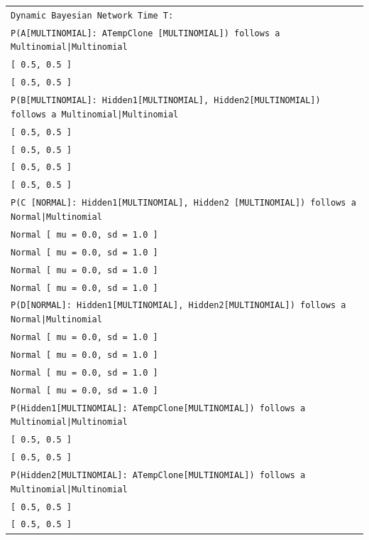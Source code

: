 \vspace{-0.1in}
\begin{table}[H]
\small{\begin{tabular}{l} \\
\texttt{Dynamic Bayesian Network Time T:}\\
\texttt{P(A[MULTINOMIAL]: ATempClone [MULTINOMIAL]) follows a Multinomial|Multinomial}\\
\texttt{[ 0.5, 0.5 ]}\\
\texttt{[ 0.5, 0.5 ]}\\
\texttt{P(B[MULTINOMIAL]: Hidden1[MULTINOMIAL], Hidden2[MULTINOMIAL]) follows a Multinomial|Multinomial}\\
\texttt{[ 0.5, 0.5 ]}\\
\texttt{[ 0.5, 0.5 ]}\\
\texttt{[ 0.5, 0.5 ]}\\
\texttt{[ 0.5, 0.5 ]}\\
\texttt{P(C [NORMAL]: Hidden1[MULTINOMIAL], Hidden2 [MULTINOMIAL]) follows a Normal|Multinomial}\\
\texttt{Normal [ mu = 0.0, sd = 1.0 ]}\\
\texttt{Normal [ mu = 0.0, sd = 1.0 ]}\\
\texttt{Normal [ mu = 0.0, sd = 1.0 ]}\\
\texttt{Normal [ mu = 0.0, sd = 1.0 ]}\\

\texttt{P(D[NORMAL]: Hidden1[MULTINOMIAL], Hidden2[MULTINOMIAL]) follows a Normal|Multinomial}\\
\texttt{Normal [ mu = 0.0, sd = 1.0 ]}\\
\texttt{Normal [ mu = 0.0, sd = 1.0 ]}\\
\texttt{Normal [ mu = 0.0, sd = 1.0 ]}\\
\texttt{Normal [ mu = 0.0, sd = 1.0 ]}\\

\texttt{P(Hidden1[MULTINOMIAL]: ATempClone[MULTINOMIAL]) follows a Multinomial|Multinomial}\\
\texttt{[ 0.5, 0.5 ]}\\
\texttt{[ 0.5, 0.5 ]}\\
\texttt{P(Hidden2[MULTINOMIAL]: ATempClone[MULTINOMIAL]) follows a Multinomial|Multinomial}\\
\texttt{[ 0.5, 0.5 ]}\\
\texttt{[ 0.5, 0.5 ]}\\

\end{tabular}}
\end{table}


